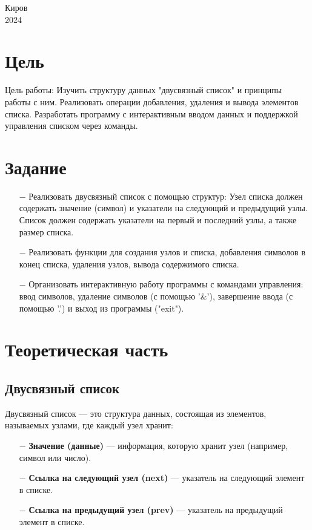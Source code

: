 \documentclass[oneside,a4paper,14pt]{extarticle}
\begin{document}
\begin{center}
	Киров\\
	2024
\end{center}

\newpage\thispagestyle{plain}

\section*{Цель}

Цель работы: Изучить структуру данных "двусвязный список" и принципы работы с ним. Реализовать операции добавления, удаления и вывода элементов списка. Разработать программу с интерактивным вводом данных и поддержкой управления списком через команды.

\section*{Задание}
\begin{itemize}
	\item[$-$] Реализовать двусвязный список с помощью структур: Узел списка должен содержать значение (символ) и указатели на следующий и предыдущий узлы. Список должен содержать указатели на первый и последний узлы, а также размер списка.
	\item[$-$] Реализовать функции для создания узлов и списка, добавления символов в конец списка, удаления узлов, вывода содержимого списка.
	\item[$-$] Организовать интерактивную работу программы с командами управления: ввод символов, удаление символов (с помощью '\&'), завершение ввода (с помощью '.') и выход из программы ("exit").
\end{itemize}

\section*{Теоретическая часть}

\subsection*{Двусвязный список}
Двусвязный список — это структура данных, состоящая из элементов, называемых узлами, где каждый узел хранит:
\begin{itemize}
	\item[$-$] \textbf{Значение (данные)} — информация, которую хранит узел (например, символ или число).
	\item[$-$] \textbf{Ссылка на следующий узел (next)} — указатель на следующий элемент в списке.
	\item[$-$] \textbf{Ссылка на предыдущий узел (prev)} — указатель на предыдущий элемент в списке.
\end{itemize}
\end{document}
